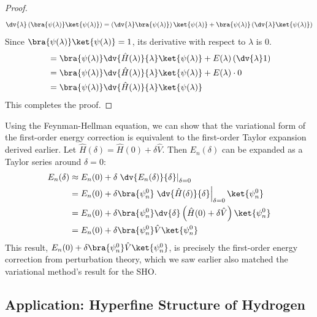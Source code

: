 \begin{proof}
\begin{equation}
        \dv{\lambda}
        \left(\bra{\psi(\lambda)}\ket{\psi(\lambda)}\right) =
        \left(\dv{\lambda} \bra{\psi(\lambda)}\right)
        \ket{\psi(\lambda)} + \bra{\psi(\lambda)} \left(\dv{\lambda}
        \ket{\psi(\lambda)}\right)
    \end{equation}
    Since $\bra{\psi(\lambda)}\ket{\psi(\lambda)} = 1$, its
    derivative with respect to $\lambda$ is $0$.
    \begin{align} \label{eq:feynman_hellman_derivation_final}
        &= \bra{\psi(\lambda)} \dv{\hat H(\lambda)}{\lambda}
        \ket{\psi(\lambda)} + E(\lambda) \left(\dv{\lambda} 1\right) \\
        &= \bra{\psi(\lambda)} \dv{\hat H(\lambda)}{\lambda}
        \ket{\psi(\lambda)} + E(\lambda) \cdot 0 \notag \\
        &= \bra{\psi(\lambda)} \dv{\hat H(\lambda)}{\lambda}
        \ket{\psi(\lambda)} \notag
    \end{align}
    This completes the proof.
\end{proof}

\begin{example}
    Using the Feynman-Hellman equation, we can show that the
    variational form of the first-order energy correction is
    equivalent to the first-order Taylor expansion derived earlier.
    Let $\hat H(\delta) = \hat H(0) + \delta\hat V$. Then
    $E_n(\delta)$ can be expanded as a Taylor series around $\delta=0$:
    \begin{align} \label{eq:taylor_expansion_feynman_hellman}
        E_n(\delta) &\approx E_n(0) + \delta
        \left.\dv{E_n(\delta)}{\delta} \right|_{\delta =0} \\
        &= E_n(0) + \delta \bra{\psi_n^0} \left.\dv{\hat
        H(\delta)}{\delta}\right|_{\delta=0} \ket{\psi_n^0} \notag \\
        &= E_n(0) + \delta \bra{\psi_n^0} \dv{\delta}\left(\hat H(0)
        + \delta\hat V\right) \ket{\psi_n^0} \notag \\
        &= E_n(0) + \delta \bra{\psi_n^0} \hat V\ket{\psi_n^0} \notag
    \end{align}
    This result, $E_n(0) + \delta \bra{\psi_n^0} \hat
    V\ket{\psi_n^0}$, is precisely the first-order energy correction
    from perturbation theory, which we saw earlier also matched the
    variational method's result for the SHO.
\end{example}

\hr
\subsection{Application: Hyperfine Structure of Hydrogen}

